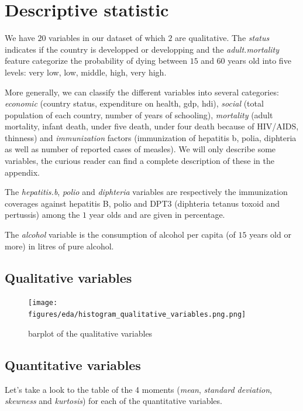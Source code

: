 \section{Descriptive statistic}

We have $20$ variables in our dataset of which $2$ are qualitative. The \textit{status} indicates if the country is developped or developping and the \textit{adult.mortality} feature categorize the probability of dying between $15$ and $60$ years old into five levels: very low, low, middle, high, very high. 

More generally, we can classify the different variables into several categories: \textit{economic} (country status, expenditure on health, gdp, hdi), \textit{social} (total population of each country, number of years of schooling), \textit{mortality} (adult mortality, infant death, under five death, under four death because of HIV/AIDS, thinness) and \textit{immunization} factors (immunization of hepatitis b, polia, diphteria as well as number of reported cases of measles). We will only describe some variables, the curious reader can find a complete description of these in the appendix.

The \textit{hepatitis.b}, \textit{polio} and \textit{diphteria} variables are respectively the immunization coverages against hepatitis B, polio and DPT3 (diphteria tetanus toxoid and pertussis) among the $1$ year olds and are given in percentage.

The \textit{alcohol} variable is the consumption of alcohol per capita (of $15$ years old or more) in litres of pure alcohol.

\subsection{Qualitative variables}

\begin{figure}[H]
	\centering
	\texttt{[image: figures/eda/histogram\_qualitative\_variables.png.png]}
	\caption{barplot of the qualitative variables}
	\label{fig:qualitative_variables_barplot}
\end{figure}

\subsection{Quantitative variables}

Let's take a look to the table of the 4 moments (\textit{mean}, \textit{standard deviation}, \textit{skewness} and \textit{kurtosis}) for each of the quantitative variables. 

